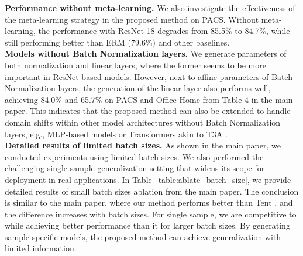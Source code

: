 \noindent\textbf{Performance without meta-learning.} 
We also investigate the effectiveness of the meta-learning strategy in the proposed method on PACS.
Without meta-learning, the performance with ResNet-18 degrades from 85.5\% to 84.7\%, while still performing better than ERM (79.6\%) and other baselines.\\



\noindent\textbf{Models without Batch Normalization layers.}
We generate parameters of both normalization and linear layers, where the former seems to be more important in ResNet-based models.
However, next to affine parameters of Batch Normalization layers, the generation of the linear layer also performs well, achieving 84.0\% and 65.7\% on PACS and Office-Home from Table 4 in the main paper. 
This indicates that the proposed method can also be extended to handle domain shifts within other model architectures without Batch Normalization layers, e.g., MLP-based models or Transformers akin to T3A \cite{iwasawa2021test}.\\





\noindent\textbf{Detailed results of limited batch sizes.} As shown in the main paper, we conducted experiments using limited batch sizes. We also performed the challenging single-sample generalization setting that widens its scope for deployment in real applications. In Table~\ref{table:ablate_batch_size}, we provide detailed results of small batch sizes ablation from the main paper. The conclusion is similar to the main paper, where our method performs better than Tent \cite{wang2021tent}, and the difference increases with batch sizes. For single sample, we are competitive to \cite{xiao2022learning} while achieving better performance than it for larger batch sizes. By generating sample-specific models, the proposed method can achieve generalization with limited information.\\


